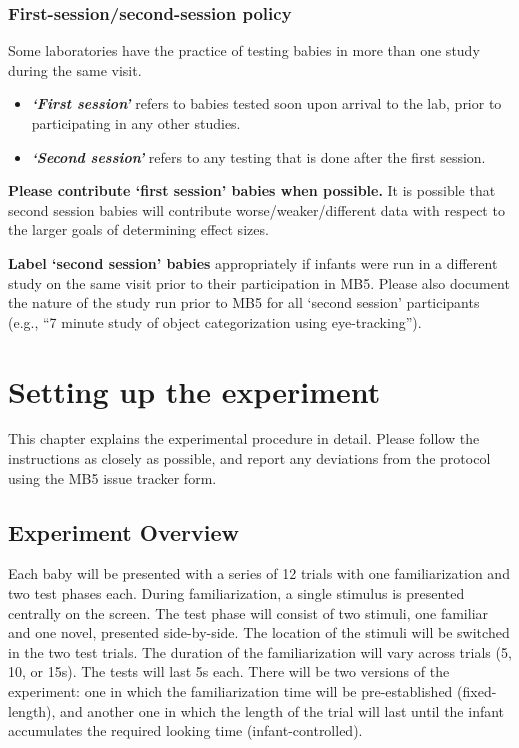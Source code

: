 \documentclass[
]{book}
\providecommand{\tightlist}{%
  \setlength{\itemsep}{0pt}\setlength{\parskip}{0pt}}
\begin{document}
\subsection{First-session/second-session policy}\label{first-sessionsecond-session-policy}

Some laboratories have the practice of testing babies in more than one study during the same visit.

\begin{itemize}
\tightlist
\item
  \textbf{\emph{`First session'}} refers to babies tested soon upon arrival to the lab, prior to participating in any other studies.
\item
  \textbf{\emph{`Second session'}} refers to any testing that is done after the first session.
\end{itemize}

\textbf{Please contribute `first session' babies when possible.} It is possible that second session babies will contribute worse/weaker/different data with respect to the larger goals of determining effect sizes.

\textbf{Label `second session' babies} appropriately if infants were run in a different study on the same visit prior to their participation in MB5. Please also document the nature of the study run prior to MB5 for all `second session' participants (e.g., ``7 minute study of object categorization using eye-tracking'').

\chapter{Setting up the experiment}\label{setting-up-the-experiment}

This chapter explains the experimental procedure in detail. Please follow the instructions as closely as possible, and report any deviations from the protocol using the MB5 issue tracker form.

\section{Experiment Overview}\label{experiment-overview}

Each baby will be presented with a series of 12 trials with one familiarization and two test phases each. During familiarization, a single stimulus is presented centrally on the screen. The test phase will consist of two stimuli, one familiar and one novel, presented side-by-side. The location of the stimuli will be switched in the two test trials. The duration of the familiarization will vary across trials (5, 10, or 15s). The tests will last 5s each. There will be two versions of the experiment: one in which the familiarization time will be pre-established (fixed-length), and another one in which the length of the trial will last until the infant accumulates the required looking time (infant-controlled).
\end{document}
